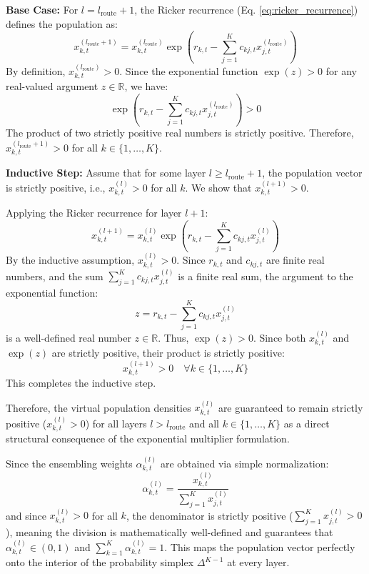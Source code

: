 \documentclass{article}
\theoremstyle{plain}
\theoremstyle{definition}
\theoremstyle{remark}
\begin{document}
\textbf{Base Case:} For $l = l_{\text{route}} + 1$, the Ricker recurrence (Eq. \ref{eq:ricker_recurrence}) defines the population as:
\begin{equation}
    x_{k, t}^{(l_{\text{route}} + 1)} = x_{k, t}^{(l_{\text{route}})} \exp\left( r_{k, t} - \sum_{j=1}^K c_{kj, t} x_{j, t}^{(l_{\text{route}})} \right)
\end{equation}
By definition, $x_{k, t}^{(l_{\text{route}})} > 0$. Since the exponential function $\exp(z) > 0$ for any real-valued argument $z \in \mathbb{R}$, we have:
\begin{equation}
    \exp\left( r_{k, t} - \sum_{j=1}^K c_{kj, t} x_{j, t}^{(l_{\text{route}})} \right) > 0
\end{equation}
The product of two strictly positive real numbers is strictly positive. Therefore, $x_{k, t}^{(l_{\text{route}} + 1)} > 0$ for all $k \in \{1, \dots, K\}$.

\textbf{Inductive Step:} Assume that for some layer $l \ge l_{\text{route}} + 1$, the population vector is strictly positive, i.e., $x_{k, t}^{(l)} > 0$ for all $k$. We show that $x_{k, t}^{(l+1)} > 0$.

Applying the Ricker recurrence for layer $l+1$:
\begin{equation}
    x_{k, t}^{(l+1)} = x_{k, t}^{(l)} \exp\left( r_{k, t} - \sum_{j=1}^K c_{kj, t} x_{j, t}^{(l)} \right)
\end{equation}
By the inductive assumption, $x_{k, t}^{(l)} > 0$. Since $r_{k, t}$ and $c_{kj, t}$ are finite real numbers, and the sum $\sum_{j=1}^K c_{kj, t} x_{j, t}^{(l)}$ is a finite real sum, the argument to the exponential function:
\begin{equation}
    z = r_{k, t} - \sum_{j=1}^K c_{kj, t} x_{j, t}^{(l)}
\end{equation}
is a well-defined real number $z \in \mathbb{R}$. Thus, $\exp(z) > 0$. Since both $x_{k, t}^{(l)}$ and $\exp(z)$ are strictly positive, their product is strictly positive:
\begin{equation}
    x_{k, t}^{(l+1)} > 0 \quad \forall k \in \{1, \dots, K\}
\end{equation}
This completes the inductive step.

Therefore, the virtual population densities $x_{k, t}^{(l)}$ are guaranteed to remain strictly positive ($x_{k, t}^{(l)} > 0$) for all layers $l > l_{\text{route}}$ and all $k \in \{1, \dots, K\}$ as a direct structural consequence of the exponential multiplier formulation.

Since the ensembling weights $\alpha_{k, t}^{(l)}$ are obtained via simple normalization:
\begin{equation}
    \alpha_{k, t}^{(l)} = \frac{x_{k, t}^{(l)}}{\sum_{j=1}^K x_{j, t}^{(l)}}
\end{equation}
and since $x_{k, t}^{(l)} > 0$ for all $k$, the denominator is strictly positive ($\sum_{j=1}^K x_{j, t}^{(l)} > 0$), meaning the division is mathematically well-defined and guarantees that $\alpha_{k, t}^{(l)} \in (0, 1)$ and $\sum_{k=1}^K \alpha_{k, t}^{(l)} = 1$. This maps the population vector perfectly onto the interior of the probability simplex $\Delta^{K-1}$ at every layer.
\end{document}
